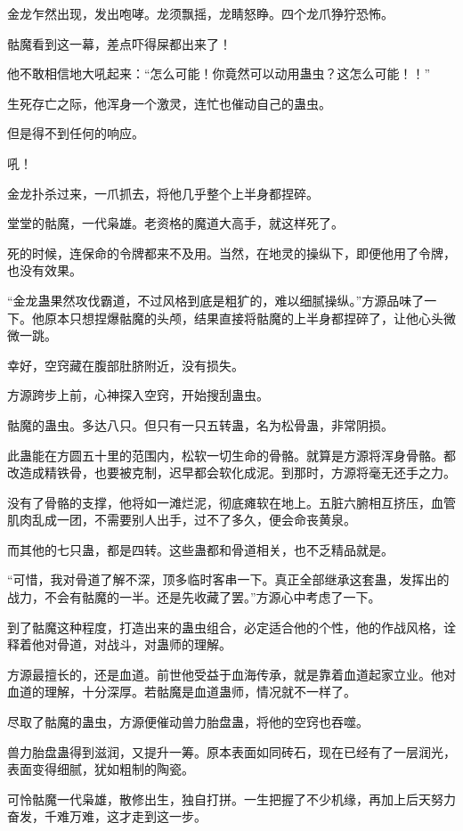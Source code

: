\begin{this_body}
金龙乍然出现，发出咆哮。龙须飘摇，龙睛怒睁。四个龙爪狰狞恐怖。

骷魔看到这一幕，差点吓得屎都出来了！

他不敢相信地大吼起来：“怎么可能！你竟然可以动用蛊虫？这怎么可能！！”

生死存亡之际，他浑身一个激灵，连忙也催动自己的蛊虫。

但是得不到任何的响应。

吼！

金龙扑杀过来，一爪抓去，将他几乎整个上半身都捏碎。

堂堂的骷魔，一代枭雄。老资格的魔道大高手，就这样死了。

死的时候，连保命的令牌都来不及用。当然，在地灵的操纵下，即便他用了令牌，也没有效果。

“金龙蛊果然攻伐霸道，不过风格到底是粗犷的，难以细腻操纵。”方源品味了一下。他原本只想捏爆骷魔的头颅，结果直接将骷魔的上半身都捏碎了，让他心头微微一跳。

幸好，空窍藏在腹部肚脐附近，没有损失。

方源跨步上前，心神探入空窍，开始搜刮蛊虫。

骷魔的蛊虫。多达八只。但只有一只五转蛊，名为松骨蛊，非常阴损。

此蛊能在方圆五十里的范围内，松软一切生命的骨骼。就算是方源将浑身骨骼。都改造成精铁骨，也要被克制，迟早都会软化成泥。到那时，方源将毫无还手之力。

没有了骨骼的支撑，他将如一滩烂泥，彻底瘫软在地上。五脏六腑相互挤压，血管肌肉乱成一团，不需要别人出手，过不了多久，便会命丧黄泉。

而其他的七只蛊，都是四转。这些蛊都和骨道相关，也不乏精品就是。

“可惜，我对骨道了解不深，顶多临时客串一下。真正全部继承这套蛊，发挥出的战力，不会有骷魔的一半。还是先收藏了罢。”方源心中考虑了一下。

到了骷魔这种程度，打造出来的蛊虫组合，必定适合他的个性，他的作战风格，诠释着他对骨道，对战斗，对蛊师的理解。

方源最擅长的，还是血道。前世他受益于血海传承，就是靠着血道起家立业。他对血道的理解，十分深厚。若骷魔是血道蛊师，情况就不一样了。

尽取了骷魔的蛊虫，方源便催动兽力胎盘蛊，将他的空窍也吞噬。

兽力胎盘蛊得到滋润，又提升一筹。原本表面如同砖石，现在已经有了一层润光，表面变得细腻，犹如粗制的陶瓷。

可怜骷魔一代枭雄，散修出生，独自打拼。一生把握了不少机缘，再加上后天努力奋发，千难万难，这才走到这一步。


\end{this_body}
